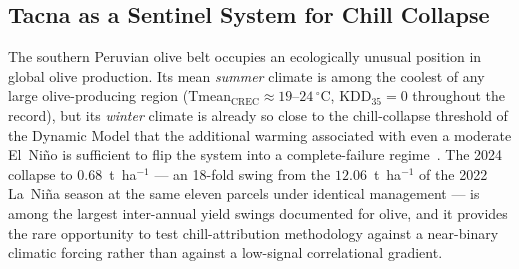 \documentclass[agronomy,article,submit,pdftex,moreauthors]{Definitions/mdpi}
\begin{document}
\subsection{Tacna as a Sentinel System for Chill Collapse}
\label{sec:discuss_sentinel}

The southern Peruvian olive belt occupies an ecologically unusual position in global olive production. Its mean \emph{summer} climate is among the coolest of any large olive-producing region (Tmean$_\text{CREC}\approx 19$--$24\,^\circ$C, KDD$_{35}=0$ throughout the record), but its \emph{winter} climate is already so close to the chill-collapse threshold of the Dynamic Model that the additional warming associated with even a moderate El~Ni\~{n}o is sufficient to flip the system into a complete-failure regime~\cite{pinovargas2022enso}. The 2024 collapse to $0.68$~t~ha$^{-1}$ --- an 18-fold swing from the $12.06$~t~ha$^{-1}$ of the 2022 La~Ni\~{n}a season at the same eleven parcels under identical management --- is among the largest inter-annual yield swings documented for olive, and it provides the rare opportunity to test chill-attribution methodology against a near-binary climatic forcing rather than against a low-signal correlational gradient.
\end{document}
